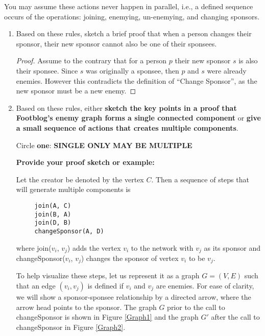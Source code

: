 \documentclass[11pt, oneside]{article}   	%
\theoremstyle{definition}
\theoremstyle{remark}
\begin{document}
You may assume these actions never happen in parallel, i.e., a defined sequence occurs of the operations: joining, enemying, un-enemying, and changing sponsors.
\begin{enumerate}
	\item Based on these rules, sketch a brief proof that when a person changes their sponsor, their new sponsor cannot also be one of their sponsees.
	
	\begin{proof}
		Assume to the contrary that for a person $p$ their new sponsor $s$ is also their sponsee. Since $s$ was originally a sponsee, then $p$ and $s$ were already enemies. However this contradicts the definition of ``Change Sponsor'', as the new sponsor must be a new enemy.
	\end{proof}		
	
	\item Based on these rules, either \textbf{sketch the key points in a proof that    Footblog's enemy graph forms a single connected component} or \textbf{give a small sequence of actions that creates multiple components}.
   
   Circle \textbf{one}: \hfill \textbf{SINGLE ONLY} \hfill \textbf{MAY BE MULTIPLE} \hfill

   \textbf{Provide your proof sketch or example:}
   
   Let the creator be denoted by the vertex $C$. Then a sequence of steps that will generate multiple components is
   \begin{verbatim}
     join(A, C)
     join(B, A)
     join(D, B)
     changeSponsor(A, D)
   \end{verbatim}
   where join($v_i$, $v_j$) adds the vertex $v_i$ to the network with $v_j$ as its sponsor and changeSponsor($v_i$, $v_j$) changes the sponsor of vertex $v_i$ to be $v_j$.
   
   
   To help visualize these steps, let us represent it as a graph $G=(V,E)$ such that an edge $(v_i, v_j)$ is defined if $v_i$ and $v_j$ are enemies. For ease of clarity, we will show a sponsor-sponsee relationship by a directed arrow, where the arrow head points to the sponsor. The graph $G$ prior to the call to changeSponsor is shown in Figure \ref{Graph1} and the graph $G'$ after the call to changeSponsor in Figure \ref{Graph2}.
   
   \begin{figure}[h]           
   	\centering
    \begin{subfigure}[b]{0.45\columnwidth}
    		\centering
\end{subfigure}
\end{figure}
\end{enumerate}
\end{document}
